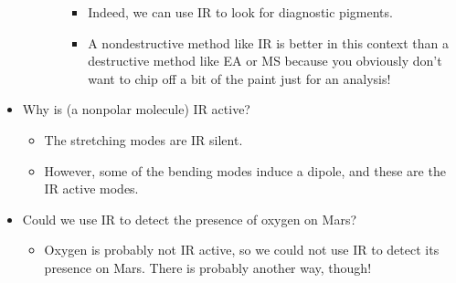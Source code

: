 \documentclass[../notes.tex]{subfiles}
\begin{document}
\begin{itemize}
\begin{itemize}
\begin{itemize}
\begin{itemize}
                \item Indeed, we can use IR to look for diagnostic pigments.
                \item A nondestructive method like IR is better in this context than a destructive method like EA or MS because you obviously don't want to chip off a bit of the paint just for an analysis!
            \end{itemize}
        \end{itemize}
    \end{itemize}
    \item Why is  (a nonpolar molecule) IR active?
    \begin{itemize}
        \item The stretching modes are IR silent.
        \item However, some of the bending modes induce a dipole, and these are the IR active modes.
    \end{itemize}
    \item Could we use IR to detect the presence of oxygen on Mars?
    \begin{itemize}
        \item Oxygen is probably not IR active, so we could not use IR to detect its presence on Mars. There is probably another way, though!
    \end{itemize}
\end{itemize}
\end{document}
